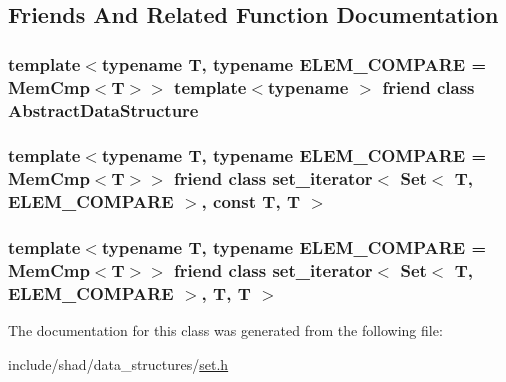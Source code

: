 \subsection{Friends And Related Function Documentation}
\hypertarget{classshad_1_1Set_ab18afa4496cc863ddc11bab94b2adf57}{
\subsubsection[{Abstract\-Data\-Structure}]{\setlength{\rightskip}{0pt plus 5cm}template$<$typename T, typename E\-L\-E\-M\-\_\-\-C\-O\-M\-P\-A\-R\-E = Mem\-Cmp$<$\-T$>$$>$ template$<$typename $>$ friend class {\bf Abstract\-Data\-Structure}\hspace{0.3cm}{\ttfamily [friend]}}}\label{classshad_1_1Set_ab18afa4496cc863ddc11bab94b2adf57}
\hypertarget{classshad_1_1Set_a98fe017bca451c95c75b7e3d03b3d15a}{
\subsubsection[{set\-\_\-iterator$<$ Set$<$ T, E\-L\-E\-M\-\_\-\-C\-O\-M\-P\-A\-R\-E $>$, const T, T $>$}]{\setlength{\rightskip}{0pt plus 5cm}template$<$typename T, typename E\-L\-E\-M\-\_\-\-C\-O\-M\-P\-A\-R\-E = Mem\-Cmp$<$\-T$>$$>$ friend class {\bf set\-\_\-iterator}$<$ {\bf Set}$<$ T, E\-L\-E\-M\-\_\-\-C\-O\-M\-P\-A\-R\-E $>$, const T, T $>$\hspace{0.3cm}{\ttfamily [friend]}}}\label{classshad_1_1Set_a98fe017bca451c95c75b7e3d03b3d15a}
\hypertarget{classshad_1_1Set_a8a0a0fdcee0e492f8b2e3ad97cc1e397}{
\subsubsection[{set\-\_\-iterator$<$ Set$<$ T, E\-L\-E\-M\-\_\-\-C\-O\-M\-P\-A\-R\-E $>$, T, T $>$}]{\setlength{\rightskip}{0pt plus 5cm}template$<$typename T, typename E\-L\-E\-M\-\_\-\-C\-O\-M\-P\-A\-R\-E = Mem\-Cmp$<$\-T$>$$>$ friend class {\bf set\-\_\-iterator}$<$ {\bf Set}$<$ T, E\-L\-E\-M\-\_\-\-C\-O\-M\-P\-A\-R\-E $>$, T, T $>$\hspace{0.3cm}{\ttfamily [friend]}}}\label{classshad_1_1Set_a8a0a0fdcee0e492f8b2e3ad97cc1e397}


The documentation for this class was generated from the following file\-:\begin{DoxyCompactItemize}
\item 
include/shad/data\-\_\-structures/\hyperlink{set_8h}{set.\-h}\end{DoxyCompactItemize}
